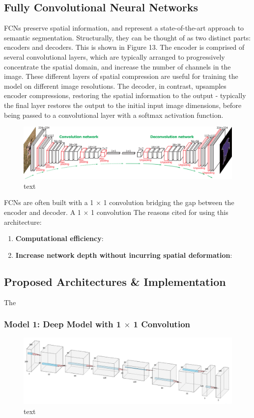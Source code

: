 \documentclass[a4paper]{article}
\begin{document}
\subsection{Fully Convolutional Neural Networks}
FCNs preserve spatial information, and represent a state-of-the-art approach to semantic segmentation. Structurally, they can be thought of as two distinct parts: encoders and decoders. This is shown in Figure 13. The encoder is comprised of several convolutional layers, which are typically arranged to progressively concentrate the spatial domain, and increase the number of channels in the image. These different layers of spatial compression are useful for training the model on different image resolutions. The decoder, in contrast, upsamples encoder compressions, restoring the spatial information to the output - typically the final layer restores the output to the initial input image dimensions, before being passed to a convolutional layer with a softmax activation function.
\begin{figure}[h]
\centering
\includegraphics[scale=0.25]{FCN}
\caption{text}
\end{figure}

FCNs are often built with a 1 $\times$ 1 convolution bridging the gap between the encoder and decoder. A 1 $\times$ 1 convolution The reasons cited for using this architecture:
\begin{enumerate}
\item \textbf{Computational efficiency}:
\item \textbf{Increase network depth without incurring spatial deformation}: 
\end{enumerate}



\subsection{Proposed Architectures \& Implementation}
The 
\subsubsection{Model 1: Deep Model with 1 $\times$ 1 Convolution}
\begin{figure}
\centering
\includegraphics[scale=0.35]{model_3(1_paper)}
\caption{text}
\end{figure}
\end{document}
